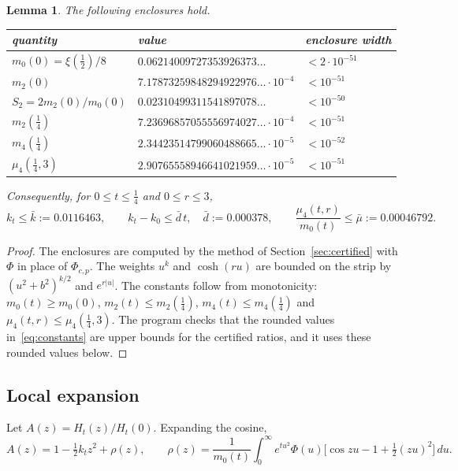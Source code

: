 \documentclass[11pt]{article}
\numberwithin{equation}{section}
\newtheorem{lemma}[theorem]{Lemma}
\theoremstyle{definition}
\theoremstyle{remark}
\newcommand{\dd}{\,d}
\begin{document}
\begin{lemma}\label{lem:moments}
The following enclosures hold.
\begin{center}
\begin{tabular}{lll}
\toprule
quantity & value & enclosure width \\
\midrule
$m_0(0)=\xi(\tfrac12)/8$ & $0.06214009727353926373\ldots$ & $<2\cdot10^{-51}$\\
$m_2(0)$ & $7.17873259848294922976\ldots\cdot10^{-4}$ & $<10^{-51}$\\
$S_2=2m_2(0)/m_0(0)$ & $0.02310499311541897078\ldots$ & $<10^{-50}$\\
$m_2(\tfrac14)$ & $7.23696857055556974027\ldots\cdot10^{-4}$ & $<10^{-51}$\\
$m_4(\tfrac14)$ & $2.34423514799060488665\ldots\cdot10^{-5}$ & $<10^{-52}$\\
$\mu_4(\tfrac14,3)$ & $2.90765558946641021959\ldots\cdot10^{-5}$ & $<10^{-51}$\\
\bottomrule
\end{tabular}
\end{center}
Consequently, for $0\le t\le\tfrac14$ and $0\le r\le3$,
\begin{equation}\label{eq:constants}
k_t\le\bar k:=0.0116463,\qquad
k_t-k_0\le\bar d\,t,\quad \bar d:=0.000378,\qquad
\frac{\mu_4(t,r)}{m_0(t)}\le\bar\mu:=0.00046792 .
\end{equation}
\end{lemma}

\begin{proof}
The enclosures are computed by the method of Section~\ref{sec:certified}
with $\Phi$ in place of $\Phi_{c,p}$. The weights $u^k$ and $\cosh(ru)$ are
bounded on the strip by $(u^2+b^2)^{k/2}$ and $e^{r|u|}$. The constants
follow from monotonicity: $m_0(t)\ge m_0(0)$, $m_2(t)\le m_2(\tfrac14)$,
$m_4(t)\le m_4(\tfrac14)$ and $\mu_4(t,r)\le\mu_4(\tfrac14,3)$. The program
checks that the rounded values in~\eqref{eq:constants} are upper bounds for
the certified ratios, and it uses these rounded values below.
\end{proof}

\subsection{Local expansion}
Let $A(z)=H_t(z)/H_t(0)$. Expanding the cosine,
\begin{equation}\label{eq:Aexp}
A(z)=1-\tfrac12k_tz^2+\rho(z),\qquad
\rho(z)=\frac1{m_0(t)}\int_0^\infty e^{tu^2}\Phi(u)
\bigl[\cos zu-1+\tfrac12(zu)^2\bigr]\dd u .
\end{equation}
\end{document}
